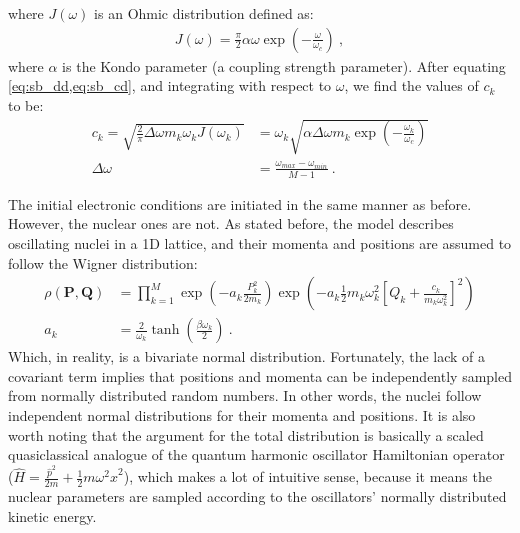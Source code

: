 where $ J(\omega) $ is an Ohmic distribution defined as:
\begin{align}\label{eq:sb_cd}
J(\omega) = \frac{\pi}{2} \alpha \omega \exp\left(-\frac{\omega}{\omega_{c}}\right)~,
\end{align}
where $ \alpha $ is the Kondo parameter (a coupling strength parameter). After equating \cref{eq:sb_dd,eq:sb_cd}, and integrating with respect to $ \omega $, we find the values of $ c_{k} $ to be:
\begin{subequations}
\begin{align}
c_{k} = \sqrt{\frac{2}{\pi} \Delta \omega m_{k} \omega_{k} J(\omega_{k})} 
&= \omega_{k} \sqrt{\alpha \Delta \omega m_{k} \exp\left(-\frac{\omega_{k}}{\omega_{c}}\right)} \\
\Delta \omega &= \frac{\omega_{max} - \omega_{min}}{M - 1}~.
\end{align}
\end{subequations}

The initial electronic conditions are initiated in the same manner as before. However, the nuclear ones are not. As stated before, the model describes oscillating nuclei in a 1D lattice, and their momenta and positions are assumed to follow the Wigner distribution:
\begin{subequations}
\begin{align}
\rho(\bm{P},\bm{Q}) &= \prod\limits_{k=1}^{M} \exp\left(-a_{k} \frac{P_{k}^{2}}{2 m_{k}}\right) \exp\left(-a_{k} \frac{1}{2} m_{k} \omega_{k}^{2} \left[Q_{k} + \frac{c_{k}}{m_{k} \omega_{k}^{2}}\right]^{2} \right)\\
a_{k} &= \frac{2}{\omega_{k}} \tanh\left(\frac{\beta \omega_{k}}{2}\right)~.
\end{align}
\end{subequations}
Which, in reality, is a bivariate normal distribution. Fortunately, the lack of a covariant term implies that positions and momenta can be independently sampled from normally distributed random numbers. In other words, the nuclei follow independent normal distributions for their momenta and positions. It is also worth noting that the argument for the total distribution is basically a scaled quasiclassical analogue of the quantum harmonic oscillator Hamiltonian operator ($ \hat{H} = \frac{\hat{p}^{2}}{2m} + \frac{1}{2} m \omega^{2} \hat{x}^{2}$), which makes a lot of intuitive sense, because it means the nuclear parameters are sampled according to the oscillators' normally distributed kinetic energy.

